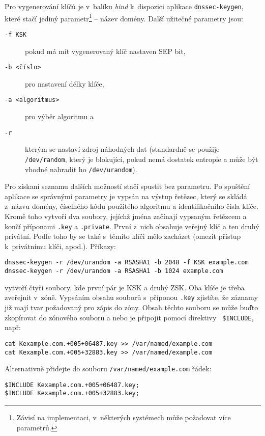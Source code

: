 Pro vygenerování klíčů je v~balíku {\em bind} k~dispozici aplikace {\tt dnssec-keygen}, které stačí jediný parametr\footnote{Závisí na implementaci, v~některých systémech může požadovat více parametrů.} -- název domény. Další užitečné parametry jsou:
\begin{description}
  \item[{\tt -f KSK}] pokud má mít vygenerovaný klíč nastaven SEP bit,
  \item[{\tt -b <číslo>}] pro nastavení délky klíče,
  \item[{\tt -a <algoritmus>}] pro výběr algoritmu a 
  \item[{\tt -r}] kterým se nastaví zdroj náhodných dat (standardně se použije {\tt /dev/random}, který je blokující, pokud nemá dostatek entropie a může být vhodné nahradit ho {\tt /dev/urandom}).
\end{description}
Pro získaní seznamu dalších možností stačí spustit bez parametru. Po spuštění aplikace se správnými parametry je vypsán na výstup řetězec, který se skládá z~názvu domény, číselného kódu použitého algoritmu a identifikačního čísla klíče. Kromě toho vytvoří dva soubory, jejíchž jména začínají vypsaným řetězcem a končí příponami {\tt .key} a {\tt .private}. První z~nich obsahuje veřejný klíč a ten druhý privátní. Podle toho by se také s~těmito klíči mělo zacházet (omezit přístup k~privátnímu klíči, apod.). Příkazy:

\begin{verbatim}
dnssec-keygen -r /dev/urandom -a RSASHA1 -b 2048 -f KSK example.com
dnssec-keygen -r /dev/urandom -a RSASHA1 -b 1024 example.com
\end{verbatim}
vytvoří čtyři soubory, kde první pár je KSK a druhý ZSK. Oba klíče je třeba
zveřejnit v~zóně. Vypsáním obsahu souborů s~příponou {\tt .key} zjistíte, že
záznamy již mají tvar požadovaný pro zápis do zóny. Obsah těchto souboru se může
buďto zkopírovat do zónového souboru a nebo je připojit pomocí direktivy {\tt
\$INCLUDE}, např:

\begin{verbatim}
cat Kexample.com.+005+06487.key >> /var/named/example.com
cat Kexample.com.+005+32883.key >> /var/named/example.com
\end{verbatim}

Alternativně přidejte do souboru {\tt /var/named/example.com} řádek:

\begin{verbatim}
$INCLUDE Kexample.com.+005+06487.key;
$INCLUDE Kexample.com.+005+32883.key;
\end{verbatim}

